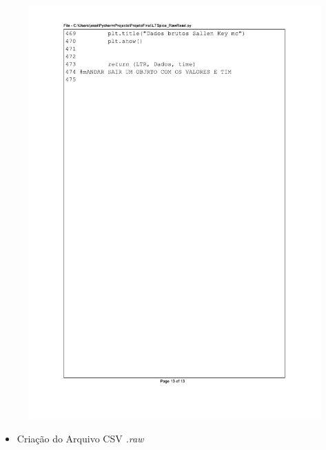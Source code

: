 \begin{figure}[]
\centering
\includegraphics[scale=0.9]{01_Pre_textuais/code/leitura13.pdf}
\end{figure}

\newpage
\begin{itemize}
    \item Criação do Arquivo CSV \textit{.raw}
\end{itemize}

